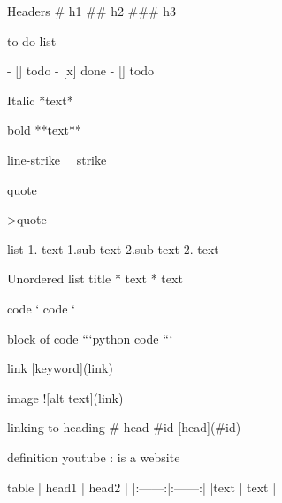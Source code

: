 Headers 
#  h1 
## h2 
### h3 

to do list 

- [] todo 
- [x] done
- [] todo

Italic 
*text*

bold 
**text**

line-strike
~~strike~~

quote 

>quote 

list 
1. text 
1.sub-text
2.sub-text
2. text 

Unordered list 
title 
* text 
* text 

code 
` code ` 

block of code 
```python 
code
```

link 
[keyword](link)

image 
![alt text](link)

linking to heading 
# head {#id}
[head](#id)


definition
youtube
: is a website 


table 
| head1  | head2  |
|:------:|:------:| 
|text    | text   |
